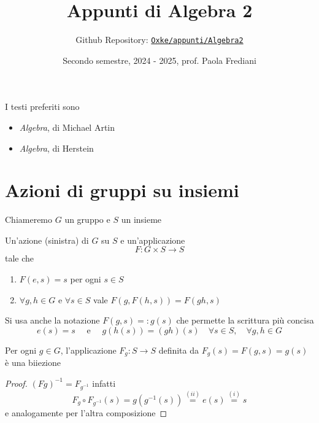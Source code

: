 

\title{Appunti di Algebra 2}
\author{Github Repository:
\href{https://github.com/Oxke/appunti/tree/main/Algebra2}{\texttt{Oxke/appunti/Algebra2}}}

\date{Secondo semestre, 2024 \-- 2025, prof. Paola Frediani}


\maketitle

I testi preferiti sono
\begin{itemize}[label = --]
    \item \textit{Algebra}, di Michael Artin
    \item \emph{Algebra}, di Herstein
\end{itemize}

\section{Azioni di gruppi su insiemi}
Chiameremo \(G\) un gruppo e \(S\) un insieme
\begin{definition}
    Un'azione (sinistra) di \(G\) su \(S\) e un'applicazione
    \[
      F : G\times S \to S
    \]
    tale che
\begin{enumerate}[label = \roman*)]
    \item \(F(e, s) = s\) per ogni \(s \in S\)
    \item \(\forall g, h \in G\) e \(\forall s \in S\) vale \(F{(g, F{(h, s)})}
        = F{(gh, s)}\) 
\end{enumerate}
\end{definition}
Si usa anche la notazione \(F{(g, s)} =: g{(s)}\) che permette la scrittura più
concisa
\[
  e{(s)} = s \quad \text{ e } \quad g{(h{(s)})} = {(gh)}{(s)} \quad \forall s
  \in S, \quad \forall g, h \in  G
\]
\begin{proposition}\label{prop:azione_biiezione}
    Per ogni \(g \in G\), l'applicazione \(F_g : S \to S\) definita da
    \(F_g{(s)} = F{(g, s)} = g{(s)}\) è una biiezione
\end{proposition}
\begin{proof}
    \({(Fg)}^{-1} = F_{g^{-1}}\) infatti 
    \[
      F_g \circ F_{g^{-1}} {(s)} = g{(g^{-1}{(s)})} \overset{(ii)}{=} e{(s)}
      \overset{(i)}{=} s
    \]
    e analogamente per l'altra composizione
\end{proof}


